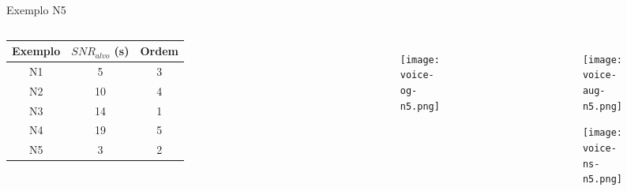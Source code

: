 \begin{frame}{Exemplo N5}
    \begin{columns}

        \begin{table} [H]
            \begin{adjustbox}{width=\columnwidth,center}
                \begin{tabular}{c|c|c}
            
                    \textbf{Exemplo} & 
                    \textbf{$SNR_{alvo}$ (s)} & 
                    \textbf{Ordem} \\
                    \hline 
            
                    N1 &  5 & 3 \\
                    N2 & 10 & 4 \\
                    N3 & 14 & 1 \\
                    N4 & 19 & 5 \\
                    N5 &  3 & 2 \\
            
                \end{tabular}
            \end{adjustbox}
        \end{table}

        \begin{figure}
            \begin{subfigure}{\textwidth}
                \centering
                \texttt{[image: voice-og-n5.png]}
            \end{subfigure}
        \end{figure}

        \begin{figure}
            \begin{subfigure}{\textwidth}
                \centering
                \texttt{[image: voice-aug-n5.png]}
            \end{subfigure}
            \begin{subfigure}{\textwidth}
                \centering
                \texttt{[image: voice-ns-n5.png]}
            \end{subfigure}
        \end{figure}
    \end{columns}
\end{frame}